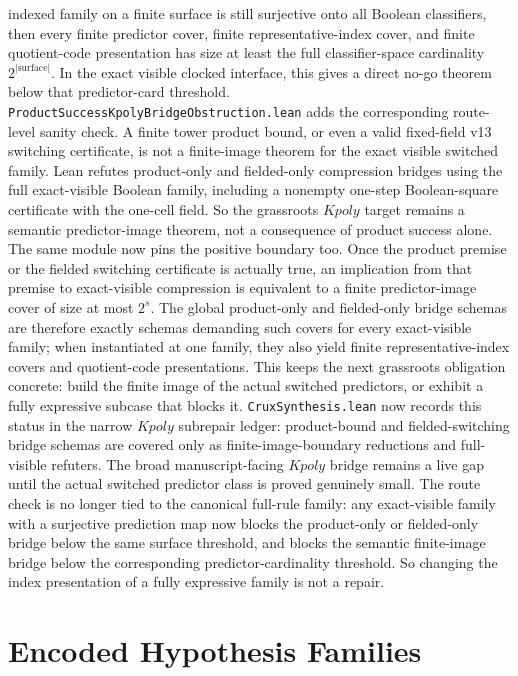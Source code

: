 \documentclass[11pt]{article}
\theoremstyle{remark}
\begin{document}
indexed family on a finite surface is still surjective onto all Boolean
classifiers, then every finite predictor cover, finite representative-index
cover, and finite quotient-code presentation has size at least the full
classifier-space cardinality \(2^{|\mathrm{surface}|}\).  In the exact visible
clocked interface, this gives a direct no-go theorem below that predictor-card
threshold.
\texttt{ProductSuccessKpolyBridgeObstruction.lean} adds the corresponding
route-level sanity check.  A finite tower product bound, or even a valid
fixed-field v13 switching certificate, is not a finite-image theorem for the
exact visible switched family.  Lean refutes product-only and fielded-only
compression bridges using the full exact-visible Boolean family, including a
nonempty one-step Boolean-square certificate with the one-cell field.  So the
grassroots \(Kpoly\) target remains a semantic predictor-image theorem, not a
consequence of product success alone.
The same module now pins the positive boundary too.  Once the product premise
or the fielded switching certificate is actually true, an implication from
that premise to exact-visible compression is equivalent to a finite
predictor-image cover of size at most \(2^s\).  The global product-only and
fielded-only bridge schemas are therefore exactly schemas demanding such covers
for every exact-visible family; when instantiated at one family, they also
yield finite representative-index covers and quotient-code presentations.
This keeps the next grassroots obligation concrete: build the finite image of
the actual switched predictors, or exhibit a fully expressive subcase that
blocks it.
\texttt{CruxSynthesis.lean} now records this status in the narrow \(Kpoly\)
subrepair ledger: product-bound and fielded-switching bridge schemas are covered
only as finite-image-boundary reductions and full-visible refuters.  The broad
manuscript-facing \(Kpoly\) bridge remains a live gap until the actual switched
predictor class is proved genuinely small.
The route check is no longer tied to the canonical full-rule family: any
exact-visible family with a surjective prediction map now blocks the
product-only or fielded-only bridge below the same surface threshold, and blocks
the semantic finite-image bridge below the corresponding predictor-cardinality
threshold.  So changing the index presentation of a fully expressive family is
not a repair.

\section{Encoded Hypothesis Families}
\end{document}
